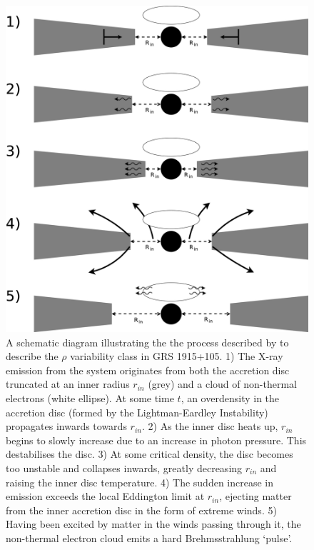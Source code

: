 \pagebreak
\begin{figure}
  \centering
  \includegraphics[width=.9\linewidth, trim= 25mm 0mm 0mm 0mm]{images/Wind_Model1.eps}
  \caption{\small A schematic diagram illustrating the the process described by \citet{Neilsen_GRSModel} to describe the $\rho$ variability class in GRS 1915+105.  1) The X-ray emission from the system originates from both the accretion disc truncated at an inner radius $r_{in}$ (grey) and a cloud of non-thermal electrons (white ellipse).  At some time $t$, an overdensity in the accretion disc (formed by the Lightman-Eardley Instability) propagates inwards towards $r_{in}$.  2) As the inner disc heats up, $r_{in}$ begins to slowly increase due to an increase in photon pressure.  This destabilises the disc.  3) At some critical density, the disc becomes too unstable and collapses inwards, greatly decreasing $r_{in}$ and raising the inner disc temperature.  4) The sudden increase in emission exceeds the local Eddington limit at $r_{in}$, ejecting matter from the inner accretion disc in the form of extreme winds.  5) Having been excited by matter in the winds passing through it, the non-thermal electron cloud emits a hard Brehmsstrahlung `pulse'.}
  \label{fig:WindsModel}
\end{figure}
\pagebreak

